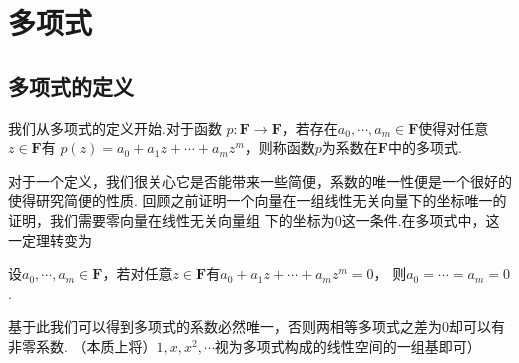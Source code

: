 \chapter{多项式}

\section{多项式的定义}
我们从多项式的定义开始.对于函数
$p:\mathbf{F}\to\mathbf{F}$，若存在$a_0,\cdots,a_m\in\mathbf{F}$使得对任意$z\in\mathbf{F}$有
$p(z)=a_0+a_1z+\cdots+a_mz^m$，则称函数$p$为系数在$\mathbf{F}$中的多项式.

对于一个定义，我们很关心它是否能带来一些简便，系数的唯一性便是一个很好的使得研究简便的性质.
回顾之前证明一个向量在一组线性无关向量下的坐标唯一的证明，我们需要零向量在线性无关向量组
下的坐标为0这一条件.在多项式中，这一定理转变为
\begin{theorem}
	设$a_0,\cdots,a_m\in\mathbf{F}$，若对任意$z\in\mathbf{F}$有$a_0+a_1z+\cdots+a_mz^m=0$，
	则$a_0=\cdots=a_m=0$.
\end{theorem}
基于此我们可以得到多项式的系数必然唯一，否则两相等多项式之差为0却可以有非零系数.
（本质上将）$1,x,x^2,\cdots$视为多项式构成的线性空间的一组基即可）

